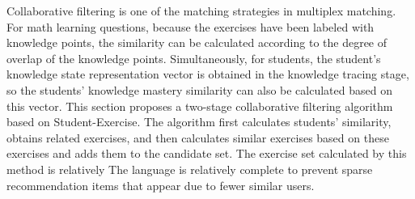 

Collaborative filtering is one of the matching strategies in multiplex matching. For math learning questions, because the exercises have been labeled with knowledge points, the similarity can be calculated according to the degree of overlap of the knowledge points. Simultaneously, for students, the student's knowledge state representation vector is obtained in the knowledge tracing stage, so the students' knowledge mastery similarity can also be calculated based on this vector. This section proposes a two-stage collaborative filtering algorithm based on Student-Exercise. The algorithm first calculates students' similarity, obtains related exercises, and then calculates similar exercises based on these exercises and adds them to the candidate set. The exercise set calculated by this method is relatively The language is relatively complete to prevent sparse recommendation items that appear due to fewer similar users.

